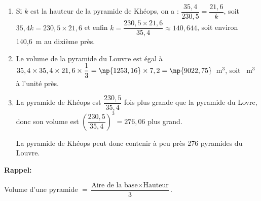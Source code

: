 
\medskip

%
%
%

\begin{enumerate}
\item %

Si $k$ est la hauteur de la pyramide de Khéops, on a : $\dfrac{35,4}{230,5} = \dfrac{21,6}{k}$, soit $35,4k = 230,5 \times 21,6$ et enfin $k = \dfrac{230,5 \times 21,6}{35,4} \approx 140,644$, soit environ 140,6~m au dixième près.
\item %
Le volume de la pyramide du Louvre est égal à $35,4 \times 35,4 \times 21,6  \times \dfrac{1}{3} = \np{1253,16} \times 7,2 = \np{9022,75}$~m$^3$, soit ~m$^3$ à l'unité près.
\item %
La pyramide de Khéops est $\dfrac{230,5}{35,4}$ fois plus grande que la pyramide du Lovre, donc son volume est $\left(\dfrac{230,5}{35,4}\right)^3 = 276,06$ plus grand.

La pyramide de Khéops peut donc contenir à peu près 276 pyramides du Louvre.
\end{enumerate}

\medskip

\textbf{Rappel:}

Volume d'une pyramide $ =  \dfrac{\text{Aire de la base} \times \text{Hauteur}}{3}$.

\bigskip

